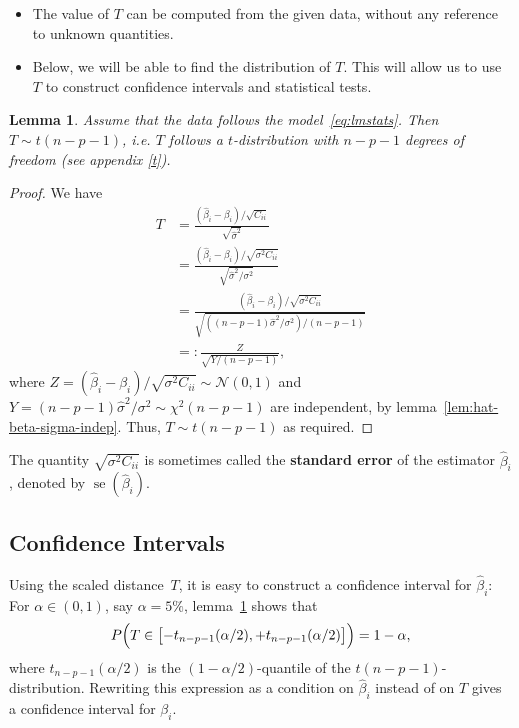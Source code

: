 \documentclass[
  a4paper,
]{article}
\newtheorem{lemma}{Lemma}[section]
\theoremstyle{definition}
\theoremstyle{definition}
\theoremstyle{definition}
\theoremstyle{definition}
\theoremstyle{remark}
\begin{document}
\begin{itemize}
\item
  The value of \(T\) can be computed from the given data, without
  any reference to unknown quantities.
\item
  Below, we will be able to find the distribution of \(T\). This will
  allow us to use \(T\) to construct confidence intervals and statistical
  tests.
\end{itemize}

\begin{lemma}
\protect\hypertarget{lem:beta-i-follows-t}{}\label{lem:beta-i-follows-t}Assume that the data follows the model~\eqref{eq:lmstats}.
Then \(T \sim t(n-p-1)\), \emph{i.e.} \(T\) follows a
\(t\)-distribution with \(n-p-1\) degrees of freedom (see appendix \ref{t}).
\end{lemma}

\begin{proof}
We have
\begin{align*}
  T
  &= \frac{(\hat\beta_i - \beta_i) / \sqrt{C_{ii}}}
      {\sqrt{\hat\sigma^2}} \\
  &= \frac{(\hat\beta_i - \beta_i) / \sqrt{\sigma^2 C_{ii}}}
      {\sqrt{\hat\sigma^2 / \sigma^2}} \\
  &= \frac{(\hat\beta_i - \beta_i) / \sqrt{\sigma^2 C_{ii}}}
      {\sqrt{((n - p - 1) \hat\sigma^2 / \sigma^2) / (n - p -1)}} \\
  &=: \frac{Z}{\sqrt{Y / (n - p - 1)}},
\end{align*}
where \(Z = (\hat\beta_i - \beta_i) / \sqrt{\sigma^2 C_{ii}} \sim \mathcal{N}(0,1)\)
and \(Y = (n - p - 1) \hat\sigma^2/\sigma^2 \sim \chi^2(n-p-1)\)
are independent, by lemma~\ref{lem:hat-beta-sigma-indep}.
Thus, \(T \sim t(n-p-1)\) as required.
\end{proof}

The quantity \(\sqrt{\sigma^2 C_{ii}}\) is sometimes called the
\textbf{standard error} of the estimator \(\hat\beta_i\), denoted by
\(\mathop{\mathrm{se}}(\hat\beta_i)\).

\hypertarget{confidence-intervals}{%
\subsection{Confidence Intervals}\label{confidence-intervals}}

Using the scaled distance~\(T\), it is easy to construct a confidence
interval for \(\hat\beta_i\): For \(\alpha \in (0, 1)\), say \(\alpha = 5\%\),
lemma~\ref{lem:beta-i-follows-t} shows that
\begin{equation*}
  P\Bigl( T \in \bigl[-t_{n-p-1}(\alpha/2), +t_{n-p-1}(\alpha/2)\bigr] \Bigr)
  = 1 - \alpha,
\end{equation*}
where \(t_{n-p-1}(\alpha/2)\) is the \((1 - \alpha/2)\)-quantile of the
\(t(n-p-1)\)-distribution. Rewriting this expression as a condition on
\(\hat\beta_i\) instead of on \(T\) gives a confidence interval for \(\beta_i\).
\end{document}

